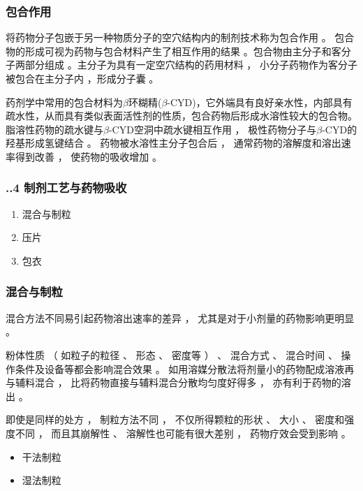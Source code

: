 \begin{frame}
    \frametitle{包合作用}
    将药物分子包嵌于另一种物质分子的空穴结构内的制剂技术称为包合作用 。 包合物的形成可视为药物与包合材料产生了相互作用的结果 。包合物由主分子和客分子两部分组成 。主分子为具有一定空穴结构的药用材料 ， 小分子药物作为客分子被包合在主分子内 ，形成分子囊 。
    \begin{blankblock}{}
        药剂学中常用的包合材料为$\beta$环糊精($\beta$-CYD)，它外端具有良好亲水性，内部具有疏水性，从而具有类似表面活性剂的性质，包合药物后形成水溶性较大的包合物。脂溶性药物的疏水键与$\beta$-CYD空洞中疏水键相互作用 ， 极性药物分子与$\beta$-CYD的羟基形成氢键结合 。 药物被水溶性主分子包合后 ， 通常药物的溶解度和溶出速率得到改善 ， 使药物的吸收增加 。
    \end{blankblock}
    
\end{frame}


\begin{frame}
    \frametitle{\thesection.\thesubsection.4 制剂工艺与药物吸收}
    \begin{enumerate}
      \item 混合与制粒
      \item 压片
      \item 包衣
    \end{enumerate}
\end{frame}


\begin{frame}
    \frametitle{混合与制粒}
    混合方法不同易引起药物溶出速率的差异 ， 尤其是对于小剂量的药物影响更明显 。 
    
    粉体性质 （ 如粒子的粒径 、 形态 、 密度等 ） 、 混合方式 、 混合时间 、 操作条件及设备等都会影响混合效果 。 如用溶媒分散法将剂量小的药物配成溶液再与辅料混合 ， 比将药物直接与辅料混合分散均匀度好得多 ， 亦有利于药物的溶出 。 

    即使是同样的处方 ， 制粒方法不同 ， 不仅所得颗粒的形状 、 大小 、 密度和强度不同 ， 而且其崩解性 、 溶解性也可能有很大差别 ， 药物疗效会受到影响 。
    \begin{itemize}
      \item 干法制粒
      \item 湿法制粒
    \end{itemize}
\end{frame}


